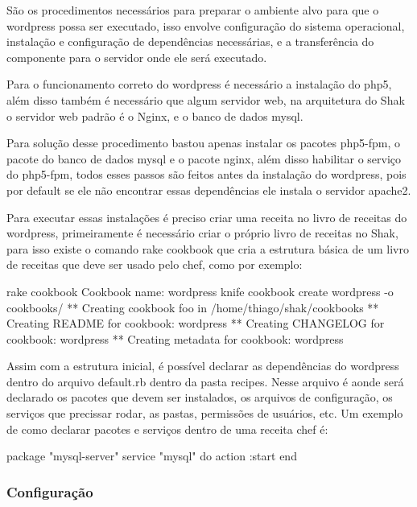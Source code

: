 São os procedimentos necessários para preparar o ambiente alvo para que o wordpress
possa ser executado, isso envolve configuração do sistema operacional, instalação
e configuração de dependências necessárias, e a transferência do componente
para o servidor onde ele será executado.

Para o funcionamento correto do wordpress é necessário a instalação do php5, além
disso também é necessário que algum servidor web, na arquitetura do Shak o servidor
web padrão é o Nginx, e o banco de dados mysql.

Para solução desse procedimento bastou apenas instalar os pacotes php5-fpm, o pacote
do banco de dados mysql e o pacote nginx, além disso habilitar o serviço do
php5-fpm, todos esses passos são feitos antes da instalação do wordpress,
pois por default se ele não encontrar essas dependências ele instala o servidor
apache2.

Para executar essas instalações é preciso criar uma receita no livro de receitas
do wordpress, primeiramente é necessário criar o próprio livro de receitas no Shak,
para isso existe o comando rake cookbook que cria a estrutura básica
de um livro de receitas que deve ser usado pelo chef, como por exemplo:

\begin{center}
  rake cookbook
  Cookbook name: wordpress
  knife cookbook create wordpress -o cookbooks/
  ** Creating cookbook foo in /home/thiago/shak/cookbooks
  ** Creating README for cookbook: wordpress
  ** Creating CHANGELOG for cookbook: wordpress
  ** Creating metadata for cookbook: wordpress
\end{center}

Assim com a estrutura inicial, é possível declarar as dependências do wordpress
dentro do arquivo default.rb dentro da pasta recipes. Nesse arquivo é aonde
será declarado os pacotes que devem ser instalados, os arquivos de configuração,
os serviços que precissar rodar, as pastas, permissões de usuários, etc. Um exemplo
de como declarar pacotes e serviços dentro de uma receita chef é:

\begin{center}
package "mysql-server"
service "mysql" do
  action :start
end
\end{center}


\subsubsection{Configuração}
\label{wordpress:preparacao}

